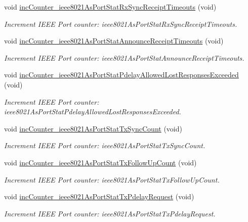 \begin{DoxyCompactItemize}
void \hyperlink{class_common_port_adf1a589504e919c03125807f4d10e9e2}{inc\+Counter\+\_\+ieee8021\+As\+Port\+Stat\+Rx\+Sync\+Receipt\+Timeouts} (void)
\begin{DoxyCompactList}\small\item\em Increment I\+E\+EE Port counter\+: ieee8021\+As\+Port\+Stat\+Rx\+Sync\+Receipt\+Timeouts. \end{DoxyCompactList}\item 
void \hyperlink{class_common_port_a05a0d76025b1ab762b3f27232d0090a5}{inc\+Counter\+\_\+ieee8021\+As\+Port\+Stat\+Announce\+Receipt\+Timeouts} (void)
\begin{DoxyCompactList}\small\item\em Increment I\+E\+EE Port counter\+: ieee8021\+As\+Port\+Stat\+Announce\+Receipt\+Timeouts. \end{DoxyCompactList}\item 
void \hyperlink{class_common_port_ae73fbbb4e445d29d617bf929edf5e708}{inc\+Counter\+\_\+ieee8021\+As\+Port\+Stat\+Pdelay\+Allowed\+Lost\+Responses\+Exceeded} (void)
\begin{DoxyCompactList}\small\item\em Increment I\+E\+EE Port counter\+: ieee8021\+As\+Port\+Stat\+Pdelay\+Allowed\+Lost\+Responses\+Exceeded. \end{DoxyCompactList}\item 
void \hyperlink{class_common_port_ac40c61600d4b809b267d06d6cc7ca469}{inc\+Counter\+\_\+ieee8021\+As\+Port\+Stat\+Tx\+Sync\+Count} (void)
\begin{DoxyCompactList}\small\item\em Increment I\+E\+EE Port counter\+: ieee8021\+As\+Port\+Stat\+Tx\+Sync\+Count. \end{DoxyCompactList}\item 
void \hyperlink{class_common_port_ae5cfa5848fcdcb7c50e2ffaecee3bf24}{inc\+Counter\+\_\+ieee8021\+As\+Port\+Stat\+Tx\+Follow\+Up\+Count} (void)
\begin{DoxyCompactList}\small\item\em Increment I\+E\+EE Port counter\+: ieee8021\+As\+Port\+Stat\+Tx\+Follow\+Up\+Count. \end{DoxyCompactList}\item 
void \hyperlink{class_common_port_ac85c9bd4c8f35aba8afa2cab2506e233}{inc\+Counter\+\_\+ieee8021\+As\+Port\+Stat\+Tx\+Pdelay\+Request} (void)
\begin{DoxyCompactList}\small\item\em Increment I\+E\+EE Port counter\+: ieee8021\+As\+Port\+Stat\+Tx\+Pdelay\+Request. \end{DoxyCompactList}\item 

\end{DoxyCompactItemize}
